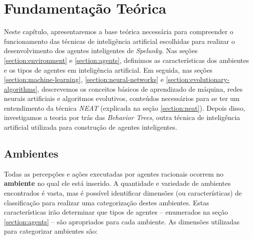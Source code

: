 \chapter{\label{chap:theory}Fundamentação Teórica}
Neste capítulo, apresentaremos a base teórica necessária para compreender o
funcionamento das técnicas de inteligência artificial escolhidas para realizar o
desenvolvimento dos agentes inteligentes de \textit{Spelunky}. Nas seções
\ref{section:environment} e \ref{section:agents}, definimos as características
dos ambientes e os tipos de agentes em inteligência artificial. Em seguida, nas
seções \ref{section:machine-learning}, \ref{section:neural-networks} e
\ref{section:evolutionary-algorithms}, descrevemos os conceitos básicos de
aprendizado de máquina, redes neurais artificiais e algoritmos evolutivos,
conteúdos necessários para se ter um entendimento da técnica \textit{NEAT}
(explicada na seção \ref{section:neat}). Depois disso, investigamos a teoria por
trás das \textit{Behavior Trees}, outra técnica de inteligência artificial
utilizada para construção de agentes inteligentes.


\section{\label{section:environment}Ambientes}
Todas as percepções e ações executadas por agentes racionais ocorrem no
\textbf{ambiente} no qual ele está inserido. A quantidade e variedade de
ambientes encontrados é vasta, mas é possível identificar dimensões (ou
características) de classificação para realizar uma categorização destes
ambientes. Estas características irão determinar que tipos de agentes --
enumerados na seção \ref{section:agents} -- são apropriados para cada ambiente.
As dimensões utilizadas para categorizar ambientes são:

